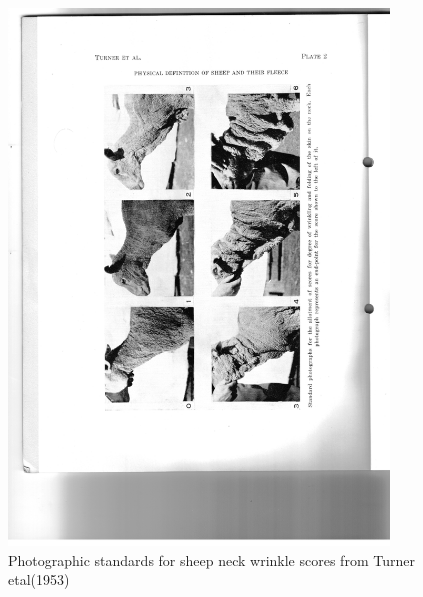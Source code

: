 %

\begin{figure}[!h]
  \centering
   \includegraphics[width=0.9\textwidth]{wrneck.png}
  \caption{Photographic standards for sheep neck wrinkle scores from Turner etal(1953)~\cite{turn:53}}
  \label{fig:wrneck}
\end{figure}

%

